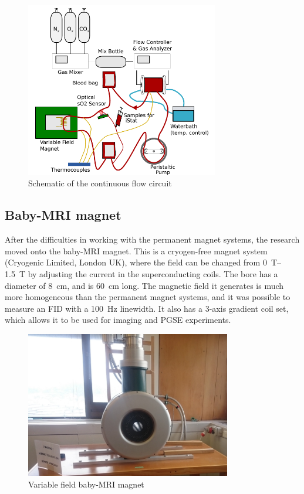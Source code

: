 \begin{figure}[t]
\centering
\includegraphics[width=0.75\textwidth]{figures/exptsetup/contflowschematic.pdf}
\caption{Schematic of the continuous flow circuit}
\label{fig:exptsetup-contflow-schematic}
\end{figure}

\subsection{Baby-MRI magnet}
After the difficulties in working with the permanent magnet systems, the research moved onto the baby-MRI magnet.
This is a cryogen-free magnet system (Cryogenic Limited, London UK), where the field can be changed from \SIrange{0}{1.5}{T} by adjusting the current in the superconducting coils.
The bore has a diameter of \SI{8}{cm}, and is \SI{60}{cm} long.
The magnetic field it generates is much more homogeneous than the permanent magnet systems, and it was possible to measure an FID with a \SI{100}{Hz} linewidth.
It also has a 3-axis gradient coil set, which allows it to be used for imaging and PGSE experiments.

\begin{figure}[t]
\centering
\includegraphics[width=0.8\textwidth]{figures/exptsetup/babymri.jpg}
\caption{Variable field baby-MRI magnet}
\label{fig:exptsetup-babymri}
\end{figure}

